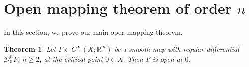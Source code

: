 \documentclass[12pt, reqno]{amsart}
\theoremstyle{plain}
\newtheorem {theorem}{Theorem}[section]
\theoremstyle{definition}
\theoremstyle{remark}
\numberwithin{equation}{section}
\newcommand{\R}{\mathbb{R}}
\newcommand{\0}{\theta}
\newcommand{\1}{{-1}}
\renewcommand{\=}{\coloneqq}
\renewcommand{\.}{\dots}
\newcommand{\mc}{\mathcal}
\begin{document}
 
 
 
 
 
 
 
 
 
 
 
 
 
 
 
 
 
 
 
 
 
 
 
 
 
 
 
 
 
 
 
 
 
 
 
 
 
 
 
 
 
 
 
 






\section{Open mapping theorem of order $n$}\label{sectwo}

In this section, we prove our main  open mapping theorem.


 
 {\color{black}

\begin{theorem}\label{thm:Gopen}
Let $ F\in C^\infty(X;\R^m)$ be a smooth map  with regular differential $ \mc D_0^n F$, $n\geq 2$,  at the critical point $0\in X$.
 Then $F$ is open at $0$.
\end{theorem}

}
\end{document}
